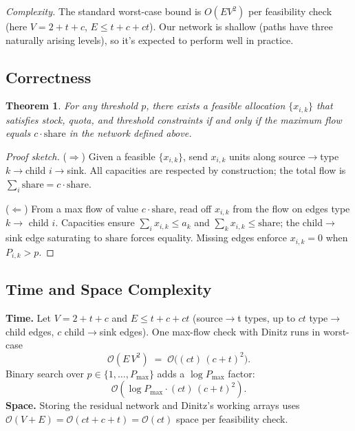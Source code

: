 \documentclass[a4paper,12pt,headsepline]{scrartcl}
\newtheorem{theorem}{Theorem}
\begin{document}
\emph{Complexity.} The standard worst-case bound is \(O(EV^2)\) per feasibility check (here \(V=2+t+c\), \(E\le t+c+ct\)). Our network is shallow (paths have three naturally arising levels), so it's expected to perform well in practice.



\subsection{Correctness}

\begin{theorem}
For any threshold $p$, there exists a feasible allocation $\{x_{i,k}\}$ that satisfies stock, quota, and threshold constraints if and only if the maximum flow equals $c \cdot \text{share}$ in the network defined above.
\end{theorem}

\begin{proof}[Proof sketch]
($\Rightarrow$) Given a feasible $\{x_{i,k}\}$, send $x_{i,k}$ units along source$\to$type $k \to$child $i\to$sink. All capacities are respected by construction; the total flow is $\sum_i \text{share} = c \cdot \text{share}$.

($\Leftarrow$) From a max flow of value $c \cdot \text{share}$, read off $x_{i,k}$ from the flow on edges type $k \to$ child $i$. Capacities ensure $\sum_i x_{i,k} \le a_k$ and $\sum_k x_{i,k} \le \text{share}$; the child$\to$sink edge saturating to $\text{share}$ forces equality. Missing edges enforce $x_{i,k}=0$ when $P_{i,k} > p$.
\end{proof}

\subsection{Time and Space Complexity}

\textbf{Time.} Let $V = 2 + t + c$ and $E \le t + c + ct$ (source$\to$t types, up to $ct$ type$\to$child edges, $c$ child$\to$sink edges). One max-flow check with Dinitz runs in worst-case 
\[
\mathcal{O}(E \, V^2) \;=\; \mathcal{O}\big((ct)\,(c{+}t)^2\big).
\]
Binary search over \(p \in \{1,\ldots,P_{\max}\}\) adds a \(\log P_{\max}\) factor:
\[
\mathcal{O}\!\left(\log P_{\max}\cdot (ct)\,(c{+}t)^2\right).
\]
\textbf{Space.} Storing the residual network and Dinitz’s working arrays uses
$\mathcal{O}(V+E)=\mathcal{O}(ct+c+t)=\mathcal{O}(ct)$ space per feasibility check.

	\newpage
	
	
	
\end{document}
